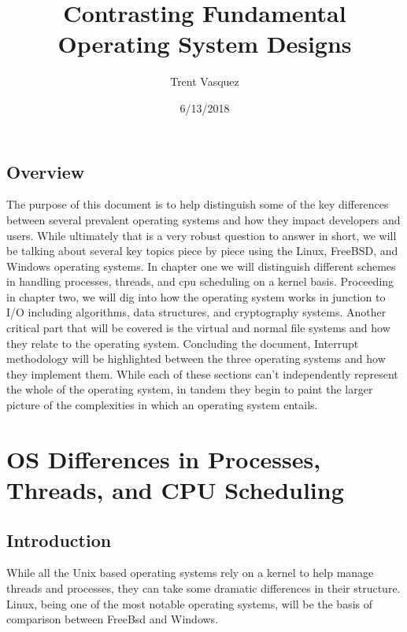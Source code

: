 \documentclass[draftclsnofoot, onecolumn] {report}
\begin{document}
\title{Contrasting Fundamental Operating System Designs}
\author{Trent Vasquez}
\date{6/13/2018}
\maketitle

\section{Overview}
The purpose of this document is to help distinguish some of the key differences between several prevalent operating systems and how they impact developers and users. 
While ultimately that is a very robust question to answer in short, we will be talking about several key topics piece by piece using the Linux, FreeBSD, and Windows operating systems.
In chapter one we will distinguish different schemes in handling processes, threads, and cpu scheduling on a kernel basis. 
Proceeding in chapter two, we will dig into how the operating system works  in junction to I/O including algorithms, data structures, and cryptography systems. 
Another critical part that will be covered is the virtual and normal file systems and how they relate to the operating system. 
Concluding the document, Interrupt methodology will be highlighted between the three operating systems and how they implement them.
While each of these sections can't independently represent the whole of the operating system, in tandem they begin to paint the larger picture of the complexities in which an operating system entails.

\chapter{OS Differences in Processes, Threads, and CPU Scheduling}

\section{Introduction}
While all the Unix based operating systems rely on a kernel to help manage threads and processes, they can take some dramatic differences in their structure. 
Linux, being one of the most notable operating systems, will be the basis of comparison between FreeBsd and Windows.
\end{document}

